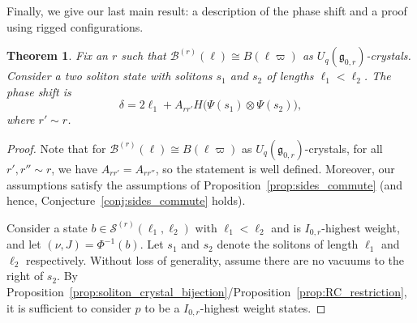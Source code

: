 \documentclass[reqno]{amsart}
\newcommand{\g}{\mathfrak{g}}
\newcommand{\iso}{\cong}
\newcommand{\Sol}{\mathcal{S}} %
\theoremstyle{plain}
\newtheorem{thm}{Theorem}[section]
\theoremstyle{definition}
\numberwithin{equation}{section}
\begin{document}
Finally, we give our last main result: a description of the phase shift and a proof using rigged configurations.

\begin{thm}
\label{thm:RC_phase_shift}
Fix an $r$ such that $\mathcal{B}^{(r)}(\ell) \iso B(\ell\varpi)$ as $U_q(\g_{0,r})$-crystals.
Consider a two soliton state with solitons $s_1$ and $s_2$ of lengths $\ell_1 < \ell_2$.
The phase shift is
\[
\delta = 2\ell_1 + A_{rr'} H\bigl(\Psi(s_1) \otimes \Psi(s_2)\bigr),
\]
where $r' \sim r$.
\end{thm}

\begin{proof}
Note that for $\mathcal{B}^{(r)}(\ell) \iso B(\ell\varpi)$ as $U_q(\g_{0,r})$-crystals, for all $r', r'' \sim r$, we have $A_{rr'} = A_{rr''}$, so the statement is well defined.
Moreover, our assumptions satisfy the assumptions of Proposition~\ref{prop:sides_commute} (and hence, Conjecture~\ref{conj:sides_commute} holds).

Consider a state $b \in \Sol^{(r)}(\ell_1, \ell_2)$ with $\ell_1 < \ell_2$ and is $I_{0,r}$-highest weight, and let $(\nu, J) = \Phi^{-1}(b)$.
Let $s_1$ and $s_2$ denote the solitons of length $\ell_1$ and $\ell_2$ respectively.
Without loss of generality, assume there are no vacuums to the right of $s_2$.
By Proposition~\ref{prop:soliton_crystal_bijection}/Proposition~\ref{prop:RC_restriction}, it is sufficient to consider $p$ to be a $I_{0,r}$-highest weight states.


\end{proof}
\end{document}
